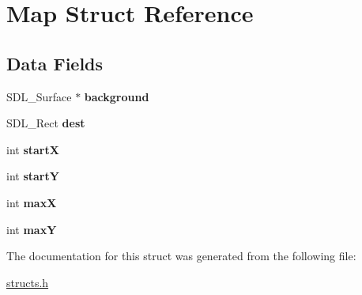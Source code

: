 \hypertarget{structMap}{}\section{Map Struct Reference}
\label{structMap}
\subsection*{Data Fields}
\begin{DoxyCompactItemize}
\item 
\mbox{\label{structMap_a4e5b5f8caa592075319b99fc221669da}} 
S\+D\+L\+\_\+\+Surface $\ast$ {\bfseries background}
\item 
\mbox{\label{structMap_a9479f346773f7343d1b87ae4e86e9b29}} 
S\+D\+L\+\_\+\+Rect {\bfseries dest}
\item 
\mbox{\label{structMap_aec09a812761311faef72bd6aae7eb586}} 
int {\bfseries startX}
\item 
\mbox{\label{structMap_a0d8a9a37385dbb4c831b61f72af82081}} 
int {\bfseries startY}
\item 
\mbox{\label{structMap_aedd73d1e84a7b38af317cf066b5c9204}} 
int {\bfseries maxX}
\item 
\mbox{\label{structMap_adb307add6076311e6fea122875955d5f}} 
int {\bfseries maxY}
\end{DoxyCompactItemize}


The documentation for this struct was generated from the following file\+:\begin{DoxyCompactItemize}
\item 
\hyperlink{structs_8h}{structs.\+h}\end{DoxyCompactItemize}
